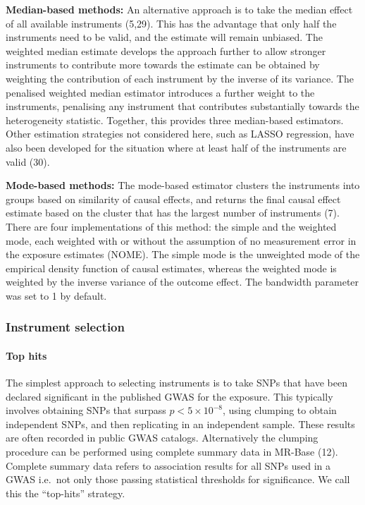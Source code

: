 \documentclass[]{article}
\let\oldparagraph\paragraph
\renewcommand{\paragraph}[1]{\oldparagraph{#1}\mbox{}}
\begin{document}
\textbf{Median-based methods:} An alternative approach is to take the
median effect of all available instruments (5,29). This has the
advantage that only half the instruments need to be valid, and the
estimate will remain unbiased. The weighted median estimate develops the
approach further to allow stronger instruments to contribute more
towards the estimate can be obtained by weighting the contribution of
each instrument by the inverse of its variance. The penalised weighted
median estimator introduces a further weight to the instruments,
penalising any instrument that contributes substantially towards the
heterogeneity statistic. Together, this provides three median-based
estimators. Other estimation strategies not considered here, such as
LASSO regression, have also been developed for the situation where at
least half of the instruments are valid (30).

\textbf{Mode-based methods:} The mode-based estimator clusters the
instruments into groups based on similarity of causal effects, and
returns the final causal effect estimate based on the cluster that has
the largest number of instruments (7). There are four implementations of
this method: the simple and the weighted mode, each weighted with or
without the assumption of no measurement error in the exposure estimates
(NOME). The simple mode is the unweighted mode of the empirical density
function of causal estimates, whereas the weighted mode is weighted by
the inverse variance of the outcome effect. The bandwidth parameter was
set to 1 by default.

\subsubsection{Instrument selection}\label{instrument-selection}

\paragraph{Top hits}\label{top-hits}

The simplest approach to selecting instruments is to take SNPs that have
been declared significant in the published GWAS for the exposure. This
typically involves obtaining SNPs that surpass \(p < 5 \times 10^{-8}\),
using clumping to obtain independent SNPs, and then replicating in an
independent sample. These results are often recorded in public GWAS
catalogs. Alternatively the clumping procedure can be performed using
complete summary data in MR-Base (12). Complete summary data refers to
association results for all SNPs used in a GWAS i.e.~not only those
passing statistical thresholds for significance. We call this the
``top-hits'' strategy.
\end{document}
